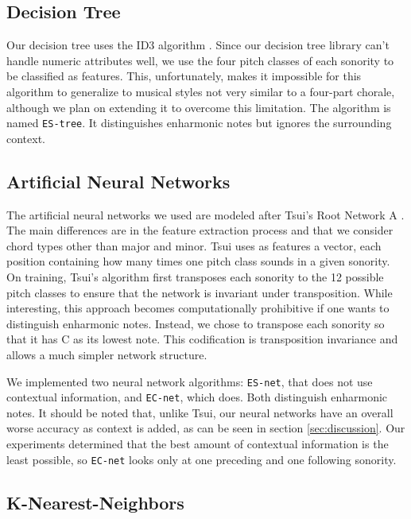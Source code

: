 \documentclass{article}
\begin{document}
\subsection{Decision Tree}
\label{sec:tree}

Our decision tree uses the ID3 algorithm \cite{mitchell97:machine}.
Since our decision tree library can't handle numeric attributes well,
we use the four pitch classes of each sonority to be classified as
features. This, unfortunately, makes it impossible for this algorithm
to generalize to musical styles not very similar to a four-part
chorale, although we plan on extending it to overcome this
limitation. The algorithm is named \texttt{ES-tree}. It distinguishes
enharmonic notes but ignores the surrounding context.

\subsection{Artificial Neural Networks}
\label{sec:neural-net}


The artificial neural networks we used are modeled after Tsui's Root
Network A \cite{tsui02:harmonic}. The main differences are in the
feature extraction process and that we consider chord types other than
major and minor. Tsui uses as features a vector, each position
containing how many times one pitch class sounds in a given sonority.
On training, Tsui's algorithm first transposes each sonority to the 12
possible pitch classes to ensure that the network is invariant under
transposition. While interesting, this approach becomes
computationally prohibitive if one wants to distinguish enharmonic
notes. Instead, we chose to transpose each sonority so that it has C
as its lowest note. This codification is transposition invariance and
allows a much simpler network structure.

We implemented two neural network algorithms: \texttt{ES-net}, that
does not use contextual information, and \texttt{EC-net}, which
does. Both distinguish enharmonic notes.  It should be noted that,
unlike Tsui, our neural networks have an overall worse accuracy as
context is added, as can be seen in section \ref{sec:discussion}. Our
experiments determined that the best amount of contextual information
is the least possible, so \texttt{EC-net} looks only at one preceding
and one following sonority.


\subsection{K-Nearest-Neighbors}
\label{sec:knn}
\end{document}
